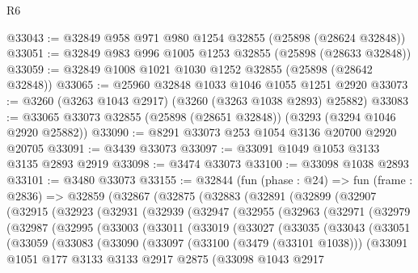 \begin{lexlean}{R6}
\begin{coremodule}
@33043 := @32849 @958 @971 @980 @1254 @32855 (@25898 (@28624 @32848))
@33051 := @32849 @983 @996 @1005 @1253 @32855 (@25898 (@28633 @32848))
@33059 := @32849 @1008 @1021 @1030 @1252 @32855 (@25898 (@28642 @32848))
@33065 := @25960 @32848 @1033 @1046 @1055 @1251 @2920
@33073 := @3260 (@3263 @1043 @2917) (@3260 (@3263 @1038 @2893) @25882)
@33083 := @33065 @33073 @32855 (@25898 (@28651 @32848)) (@3293 (@3294 @1046 @2920 @25882))
@33090 := @8291 @33073 @253 @1054 @3136 @20700 @2920 @20705
@33091 := @3439 @33073
@33097 := @33091 @1049 @1053 @3133 @3135 @2893 @2919
@33098 := @3474 @33073
@33100 := @33098 @1038 @2893
@33101 := @3480 @33073
@33155 := @32844
    (fun (phase : @24) =>
    fun (frame : @2836) =>
    @32859
      (@32867
        (@32875
          (@32883
            (@32891
              (@32899
                (@32907
                  (@32915
                    (@32923
                      (@32931
                        (@32939
                          (@32947
                            (@32955
                              (@32963
                                (@32971
                                  (@32979
                                    (@32987
                                      (@32995
                                        (@33003
                                          (@33011
                                            (@33019
                                              (@33027
                                                (@33035
                                                  (@33043
                                                    (@33051
                                                      (@33059
                                                        (@33083
                                                          (@33090
                                                            (@33097
                                                              (@33100 (@3479 (@33101 @1038)))
                                                              (@33091
                                                                @1051
                                                                @177
                                                                @3133
                                                                @3133
                                                                @2917
                                                                @2875
                                                                (@33098
                                                                  @1043
                                                                  @2917

\end{coremodule}
\end{lexlean}
